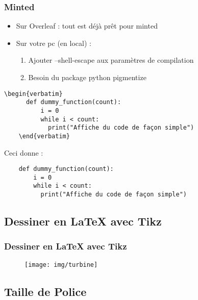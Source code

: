 \begin{frame}[fragile]
  \frametitle{Minted}

  \begin{itemize}
    \item Sur Overleaf : tout est déjà prêt pour minted
    \item Sur votre pc (en local) :
    \begin{enumerate}
      \item Ajouter --shell-escape aux paramètres de compilation
      \item Besoin du package python pigmentize
    \end{enumerate}
  \end{itemize}

  \begin{lstlisting}[mathescape=true]
    \begin{verbatim}
      def dummy_function(count):
          i = 0
          while i < count:
            print("Affiche du code de façon simple")
    \end{verbatim}\end{lstlisting}

  Ceci donne :

  \begin{verbatim}
    def dummy_function(count):
        i = 0
        while i < count:
          print("Affiche du code de façon simple")
  \end{verbatim}
\end{frame}

\subsection{Dessiner en LaTeX avec Tikz}

\begin{frame}[fragile]
  \frametitle{Dessiner en LaTeX avec Tikz}
  \begin{figure}[!ht] \centering
    \texttt{[image: img/turbine]}
  \end{figure}
\end{frame}

\subsection{Taille de Police}

